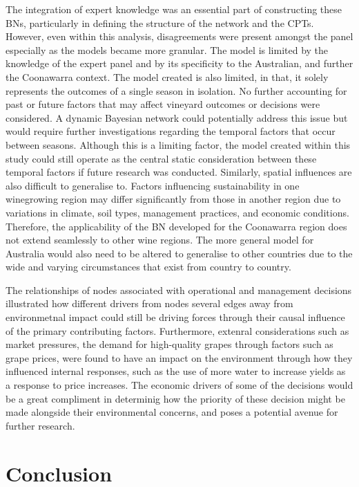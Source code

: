 \documentclass[fleqn,10pt]{wlscirep}
\begin{document}
The integration of expert knowledge was an essential part of constructing these BNs, particularly in defining the structure of the network and the CPTs. However, even within this analysis, disagreements were present amongst the panel especially as the models became more granular. The model is limited by the knowledge of the expert panel and by its specificity to the Australian, and further the Coonawarra context. The model created is also limited, in that, it solely represents the outcomes of a single season in isolation. No further accounting for past or future factors that may affect vineyard outcomes or decisions were considered. A dynamic Bayesian network could potentially address this issue but would require further investigations regarding the temporal factors that occur between seasons. Although this is a limiting factor, the model created within this study could still operate as the central static consideration between these temporal factors if future research was conducted. Similarly, spatial influences are also difficult to generalise to. Factors influencing sustainability in one winegrowing region may differ significantly from those in another region due to variations in climate, soil types, management practices, and economic conditions. Therefore, the applicability of the BN developed for the Coonawarra region does not extend seamlessly to other wine regions. The more general model for Australia would also need to be altered to generalise to other countries due to the wide and varying circumstances that exist from country to country.

The relationships of nodes associated with operational and management  decisions illustrated how different drivers from nodes several edges away from environmetnal impact could still be driving forces through their causal influence of the primary contributing factors. Furthermore, extenral considerations such as market pressures, the demand for high-quality grapes through factors such as grape prices, were found to have an impact on the environment through how they influenced internal responses, such as the use of more water to increase yields as a response to price increases. The economic drivers of some of the decisions would be a great compliment in determinig how the priority of these decision might be made alongside their environmental concerns, and poses a potential avenue for further research.

\section*{Conclusion}
\end{document}
